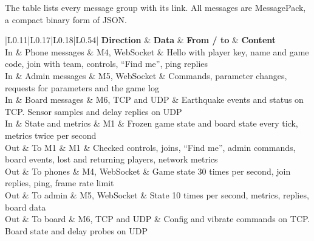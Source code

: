 \documentclass[
  english,
  10pt,
  a4paper,
]{article}
\newcommand{\ckkeep}[1]{\par\noindent\begin{minipage}{\linewidth}\setlength{\parskip}{4pt}#1\end{minipage}\par\smallskip}
\begin{document}

\ckkeep{%
The table lists every message group with its link. All messages are MessagePack, a compact binary
form of JSON.

\begin{tabular}{|L{0.11}|L{0.17}|L{0.18}|L{0.54}|}
\hline \textbf{Direction} & \textbf{Data} & \textbf{From / to} & \textbf{Content} \\ \hline 
In & Phone messages & M4, WebSocket & Hello with player key, name and game code, join with team, controls, ``Find me'', ping replies \\ \hline
In & Admin messages & M5, WebSocket & Commands, parameter changes, requests for parameters and the game log \\ \hline
In & Board messages & M6, TCP and UDP & Earthquake events and status on TCP. Sensor samples and delay replies on UDP \\ \hline
In & State and metrics & M1 & Frozen game state and board state every tick, metrics twice per second \\ \hline
Out & To M1 & M1 & Checked controls, joins, ``Find me'', admin commands, board events, lost and returning players, network metrics \\ \hline
Out & To phones & M4, WebSocket & Game state 30 times per second, join replies, ping, frame rate limit \\ \hline
Out & To admin & M5, WebSocket & State 10 times per second, metrics, replies, board data \\ \hline
Out & To board & M6, TCP and UDP & Config and vibrate commands on TCP. Board state and delay probes on UDP \\ \hline
\end{tabular}}

\end{document}
